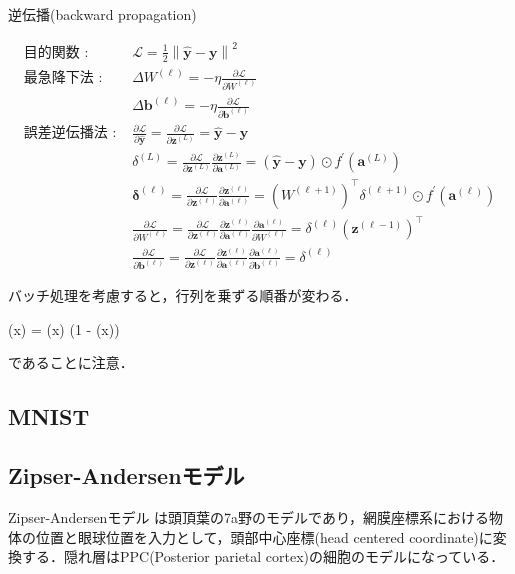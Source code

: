 逆伝播(backward propagation)


\begin{align}
\text{目的関数 : }&\mathcal{L}=\frac{1}{2}\left\|\hat{\mathbf{y}}-\mathbf{y}\right\|^{2}\\
\text{最急降下法 : }&\Delta W^{(\ell)}=-\eta \frac{\partial \mathcal{L}}{\partial W^{(\ell)}}\\
&\Delta \mathbf{b}^{(\ell)}=-\eta \frac{\partial \mathcal{L}}{\partial \mathbf{b}^{(\ell)}}\\
\text{誤差逆伝播法 : }&\frac{\partial \mathcal{L}}{\partial \hat{\mathbf{y}}}=\frac{\partial \mathcal{L}}{\partial \mathbf{z}^{(L)}}=\hat{\mathbf{y}}-\mathbf{y}\\
&\delta^{(L)}=\frac{\partial \mathcal{L}}{\partial \mathbf{z}^{(L)}} \frac{\partial \mathbf{z}^{(L)}}{\partial \mathbf{a}^{(L)}}=\left(\hat{\mathbf{y}}-\mathbf{y}\right) \odot f^{\prime}\left(\mathbf{a}^{(L)}\right)\\
&\mathbf{\delta}^{(\ell)}=\frac{\partial \mathcal{L}}{\partial \mathbf{z}^{(\ell)}} \frac{\partial \mathbf{z}^{(\ell)}}{\partial \mathbf{a}^{(\ell)}}=\left(W^{(\ell+1)}\right)^\top \delta^{(\ell+1)} \odot f^{\prime}\left(\mathbf{a}^{(\ell)}\right)\\
&\frac{\partial \mathcal{L}}{\partial W^{(\ell)}}=\frac{\partial \mathcal{L}}{\partial \mathbf{z}^{(\ell)}} \frac{\partial \mathbf{z}^{(\ell)}}{\partial \mathbf{a}^{(\ell)}} \frac{\partial \mathbf{a}^{(\ell)}}{\partial W^{(\ell)}}=\delta^{(\ell)}\left(\mathbf{z}^{(\ell-1)}\right)^\top\\
&\frac{\partial \mathcal{L}}{\partial \mathbf{b}^{(\ell)}}=\frac{\partial \mathcal{L}}{\partial \mathbf{z}^{(\ell)}} \frac{\partial \mathbf{z}^{(\ell)}}{\partial \mathbf{a}^{(\ell)}} \frac{\partial \mathbf{a}^{(\ell)}}{\partial \mathbf{b}^{(\ell)}}=\delta^{(\ell)}
\end{align}


バッチ処理を考慮すると，行列を乗ずる順番が変わる．


 (x) = (x) \cdot \left(1 - (x)\right)

であることに注意．
\subsection{MNIST}
\subsection{Zipser-Andersenモデル}
Zipser-Andersenモデル \cite{Zipser1988-nc} は頭頂葉の7a野のモデルであり，網膜座標系における物体の位置と眼球位置を入力として，頭部中心座標(head centered coordinate)に変換する．隠れ層はPPC(Posterior parietal cortex)の細胞のモデルになっている．
